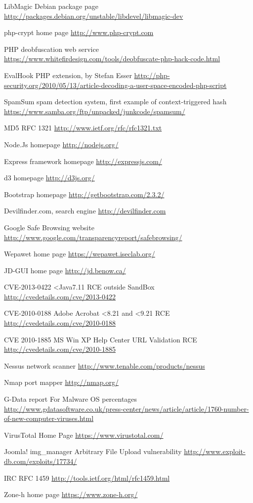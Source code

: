 \begin{thebibliography}{99}
LibMagic Debian package page
\url{http://packages.debian.org/unstable/libdevel/libmagic-dev}

php-crypt home page
\url{http://www.php-crypt.com}

PHP deobfuscation web service
\url{https://www.whitefirdesign.com/tools/deobfuscate-php-hack-code.html}

EvalHook PHP extension, by Stefan Esser
\url{http://php-security.org/2010/05/13/article-decoding-a-user-space-encoded-php-script}

SpamSum spam detection system, first example of context-triggered hash
\url{https://www.samba.org/ftp/unpacked/junkcode/spamsum/}

MD5 RFC 1321
\url{http://www.ietf.org/rfc/rfc1321.txt}

Node.Js homepage
\url{http://nodejs.org/}

Express framework homepage
\url{http://expressjs.com/}

d3 homepage
\url{http://d3js.org/}

Bootstrap homepage
\url{http://getbootstrap.com/2.3.2/}

Devilfinder.com, search engine
\url{http://devilfinder.com}

Google Safe Browsing website
\url{http://www.google.com/transparencyreport/safebrowsing/}

Wepawet home page
\url{https://wepawet.iseclab.org/}

JD-GUI home page
\url{http://jd.benow.ca/}

CVE-2013-0422 <Java7.11 RCE outside SandBox
\url{http://cvedetails.com/cve/2013-0422}

CVE-2010-0188 Adobe Acrobat <8.21 and <9.21 RCE
\url{http://cvedetails.com/cve/2010-0188}

CVE 2010-1885 MS Win XP Help Center URL Validation RCE
\url{http://cvedetails.com/cve/2010-1885}

Nessus network scanner
\url{http://www.tenable.com/products/nessus}

Nmap port mapper
\url{http://nmap.org/}

G-Data report For Malware OS percentages
\url{http://www.gdatasoftware.co.uk/press-center/news/article/article/1760-number-of-new-computer-viruses.html}

VirusTotal Home Page
\url{https://www.virustotal.com/}

Joomla! img\_manager Arbitrary File Upload vulnerability
\url{http://www.exploit-db.com/exploits/17734/}

IRC RFC 1459
\url{http://tools.ietf.org/html/rfc1459.html}

Zone-h home page
\url{https://www.zone-h.org/}

\end{thebibliography}
